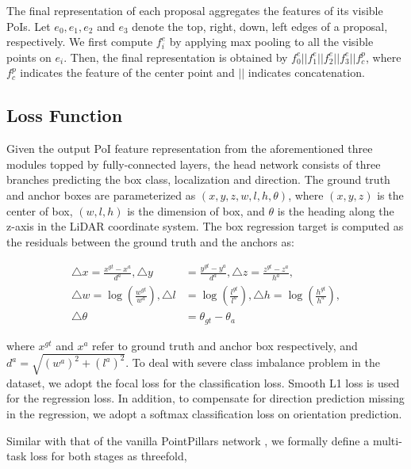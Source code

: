 \documentclass[runningheads]{llncs}
\begin{document}
The final representation of each proposal aggregates the features of its visible PoIs. Let $e_0, e_1, e_2$ and $e_3$ denote the top, right, down, left edges of a proposal, respectively. We first compute $f^e_i$ by applying max pooling to all the visible points on $e_i$. Then, the final representation is obtained by $f^e_0||f^e_1||f^e_2||f^e_3||f^p_c$, where $f^p_c$ indicates the feature of the center point and $||$ indicates concatenation.

\subsection{Loss Function}
Given the output PoI feature representation from the aforementioned three modules topped by fully-connected layers, the head network consists of three branches predicting the box class, localization and direction. The ground truth and anchor boxes are parameterized as $ (x, y, z, w, l, h, \theta) $, where $(x, y, z)$ is the center of box, $(w, l , h)$ is the dimension of box, and $\theta$ is the heading along the z-axis in the LiDAR coordinate system. The box regression target is computed as the residuals between the ground truth and the anchors as:

\begin{equation}
\begin{split}
    \triangle x = \frac{x^{gt} - x^a}{d^a},  \triangle y &= \frac{y^{gt} - y^a}{d^a},  
\triangle z = \frac{z^{gt} - z^a}{h^a}, \\
\triangle w = \log (\frac{w^{gt}}{{w^{a}}}),  \triangle l &= \log (\frac{l^{gt}}{{l^{a}}}),  
\triangle h = \log (\frac{h^{gt}}{{h^{a}}}), \\
\triangle \theta &= \theta_{gt} - \theta_{a}
\end{split}
\end{equation} 

where $x^{gt}$ and $x^a$ refer to ground truth and anchor box respectively, and $ d^a = \sqrt{(w^a)^2 + (l^a)^2} $. To deal with severe class imbalance problem in the dataset, we adopt the focal loss \cite{lin2017focal} for the classification loss. Smooth L1 loss \cite{Girshick_2014_CVPR} is used for the regression loss. In addition, to compensate for direction prediction missing in the regression, we adopt a softmax classification loss on orientation prediction. 

Similar with that of the vanilla PointPillars network \cite{lang2019PointPillars}, we formally define a multi-task loss for both stages as threefold, 
\end{document}
